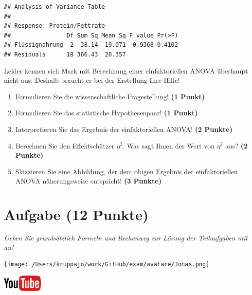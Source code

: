 \documentclass[a4paper, 9pt]{scrartcl}\usepackage[]{graphicx}\usepackage[]{xcolor}
\makeatletter
\newenvironment{kframe}{%
 \def\at@end@of@kframe{}%
 \ifinner\ifhmode%
  \def\at@end@of@kframe{\end{minipage}}%
  \begin{minipage}{\columnwidth}%
 \fi\fi%
 \def\FrameCommand##1{\hskip\@totalleftmargin \hskip-\fboxsep
 \colorbox{shadecolor}{##1}\hskip-\fboxsep
     \hskip-\linewidth \hskip-\@totalleftmargin \hskip\columnwidth}%
 \MakeFramed {\advance\hsize-\width
   \@totalleftmargin\z@ \linewidth\hsize
   \@setminipage}}%
 {\par\unskip\endMakeFramed%
 \at@end@of@kframe}
\newenvironment{knitrout}{}{} %
\makeatother
\begin{document}
\begin{knitrout}
\color{fgcolor}\begin{kframe}
\begin{verbatim}
## Analysis of Variance Table
## 
## Response: Protein/Fettrate
##                Df Sum Sq Mean Sq F value Pr(>F)
## Flüssignahrung  2  38.14  19.071  0.9368 0.4102
## Residuals      18 366.43  20.357
\end{verbatim}
\end{kframe}
\end{knitrout}

\vspace{1ex}

Leider kennen sich Mark mit Berechnung einer einfaktoriellen ANOVA überhaupt nicht aus. Deshalb braucht er bei der Erstellung Ihre Hilfe! 

\begin{enumerate}
  \item Formulieren Sie die wissenschaftliche Fragestellung! \textbf{(1 Punkt)}
  \item Formulieren Sie das statistische Hypothesenpaar! \textbf{(1 Punkt)}
\item Interpretieren Sie das Ergebnis der einfaktoriellen ANOVA! \textbf{(2 Punkte)} 
\item Berechnen Sie den Effektschätzer $\eta^2$. Was sagt Ihnen der Wert von $\eta^2$ aus? \textbf{(2 Punkte)}
\item Skizzieren Sie eine Abbildung, der dem obigen Ergebnis der
  einfaktoriellen ANOVA näherungsweise entspricht! \textbf{(3 Punkte)}
\end{enumerate}

 
\clearpage

\section{Aufgabe \hfill (12 Punkte)}

\textit{Geben Sie grundsätzlich Formeln und Rechenweg zur Lösung der Teilaufgaben mit an!} \\[1Ex]
 

 
\begin{minipage}[t]{0.5\textwidth}
\texttt{[image: /Users/kruppajo/work/GitHub/exam/avatare/Jonas.png]}
\end{minipage}
\begin{minipage}[t]{0.5\textwidth}
\hfill
\href{https://youtu.be/8Pb2sKUIMyk}{\includegraphics[width = 2cm]{img/youtube}}\\[1Ex]
\end{minipage}
\vspace{1ex}
\end{document}
